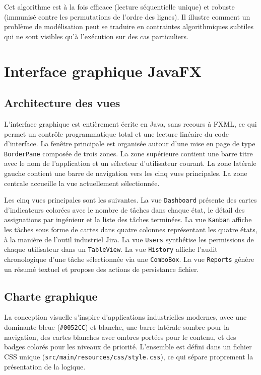 \documentclass[11pt]{article}
\begin{document}
Cet algorithme est à la fois efficace (lecture séquentielle unique) et
robuste (immunisé contre les permutations de l'ordre des lignes). Il
illustre comment un problème de modélisation peut se traduire en
contraintes algorithmiques subtiles qui ne sont visibles qu'à
l'exécution sur des cas particuliers.

\section{Interface graphique JavaFX}

\subsection{Architecture des vues}
L'interface graphique est entièrement écrite en Java, sans recours à
FXML, ce qui permet un contrôle programmatique total et une lecture
linéaire du code d'interface. La fenêtre principale est organisée autour
d'une mise en page de type \texttt{BorderPane} composée de trois zones.
La zone supérieure contient une barre titre avec le nom de l'application
et un sélecteur d'utilisateur courant. La zone latérale gauche contient
une barre de navigation vers les cinq vues principales. La zone centrale
accueille la vue actuellement sélectionnée.

Les cinq vues principales sont les suivantes. La vue \texttt{Dashboard}
présente des cartes d'indicateurs colorées avec le nombre de tâches dans
chaque état, le détail des assignations par ingénieur et la liste des
tâches terminées. La vue \texttt{Kanban} affiche les tâches sous forme
de cartes dans quatre colonnes représentant les quatre états, à la
manière de l'outil industriel Jira. La vue \texttt{Users} synthétise les
permissions de chaque utilisateur dans un \texttt{TableView}. La vue
\texttt{History} affiche l'audit chronologique d'une tâche sélectionnée
via une \texttt{ComboBox}. La vue \texttt{Reports} génère un résumé
textuel et propose des actions de persistance fichier.

\subsection{Charte graphique}
La conception visuelle s'inspire d'applications industrielles modernes,
avec une dominante bleue (\texttt{\#0052CC}) et blanche, une barre
latérale sombre pour la navigation, des cartes blanches avec ombres
portées pour le contenu, et des badges colorés pour les niveaux de
priorité. L'ensemble est défini dans un fichier CSS unique
(\texttt{src/main/resources/css/style.css}), ce qui sépare proprement la
présentation de la logique.
\end{document}
